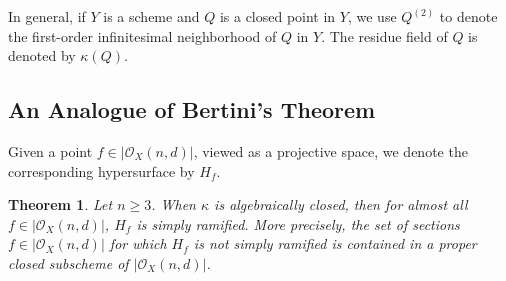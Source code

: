 \documentclass[12pt]{article}
\theoremstyle{plain}
\newtheorem{theorem}[equation]{Theorem}
\theoremstyle{definition}
\newcommand{\sO}{\mathcal{O}}
\newcommand{\<}{\langle}
\renewcommand{\>}{\rangle}
\begin{document}
In general, if $Y$ is a scheme and $Q$ is a closed point in $Y$, we use $Q^{(2)}$ to denote the first-order infinitesimal neighborhood of $Q$ in $Y$. The residue field of $Q$ is denoted by $\kappa(Q)$.

\subsection{An Analogue of Bertini's Theorem} 
Given a point $f \in |\sO_X(n,d)|$, viewed as a projective space, we denote the corresponding hypersurface by $H_f$. 
\begin{theorem}
Let $n \ge 3$. When $\kappa$ is algebraically closed, then for almost all $f \in |\sO_X(n,d)|$, $H_f$ is simply ramified. More precisely, the set of sections $f \in |\sO_X(n, d)|$ for which $H_f$ is not simply ramified is contained in a proper closed subscheme of $|\sO_X(n, d)|$. 
\end{theorem} 
\end{document}
